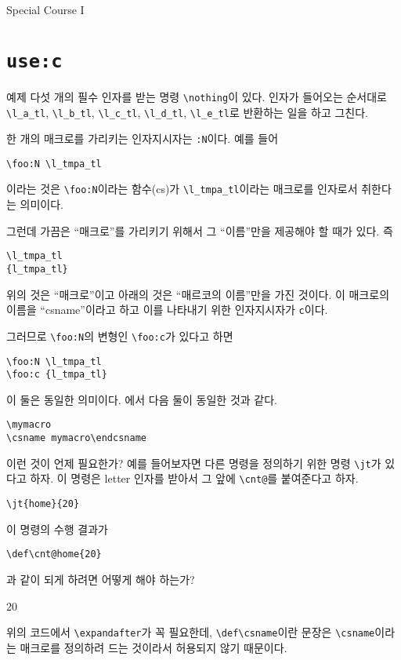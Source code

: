 \documentclass[a4paper,amsmath]{oblivoir}
\begin{document}
\begin{intro}[100]
Special Course I
\end{intro}

\section{\texttt{\bs use:c}}

\begin{questiona}{예제}
다섯 개의 필수 인자를 받는 명령 \verb|\nothing|이 있다. 인자가 들어오는 순서대로
\verb|\l_a_tl|, \verb|\l_b_tl|, \verb|\l_c_tl|, \verb|\l_d_tl|, \verb|\l_e_tl|로
반환하는 일을 하고 그친다.
\end{questiona}

한 개의 매크로를 가리키는 인자지시자는 \verb|:N|이다. 예를 들어
\begin{verbatim}
\foo:N \l_tmpa_tl
\end{verbatim}
이라는 것은 \verb|\foo:N|이라는 함수(cs)가 \verb|\l_tmpa_tl|이라는 매크로를 인자로서
취한다는 의미이다.

그런데 가끔은 “매크로”를 가리키기 위해서 그 “이름”만을 제공해야 할 때가 있다. 즉 
\begin{verbatim}
\l_tmpa_tl
{l_tmpa_tl}
\end{verbatim}
위의 것은 “매크로”이고 아래의 것은 “매르코의 이름”만을 가진 것이다. 이 매크로의 이름을 “csname”이라고 하고 이를 나타내기 위한 인자지시자가 \verb|c|이다.

그러므로 \verb|\foo:N|의 변형인 \verb|\foo:c|가 있다고 하면
\begin{verbatim}
\foo:N \l_tmpa_tl
\foo:c {l_tmpa_tl}
\end{verbatim}
이 둘은 동일한 의미이다.
에서 다음 둘이 동일한 것과 같다.
\begin{verbatim}
\mymacro
\csname mymacro\endcsname
\end{verbatim}

이런 것이 언제 필요한가? 예를 들어보자면 다른 명령을 정의하기 위한 명령 \verb|\jt|가 있다고 하자.
이 명령은 letter 인자를 받아서 그 앞에 \verb|\cnt@|를 붙여준다고 하자.
\begin{verbatim}
\jt{home}{20}
\end{verbatim}
이 명령의 수행 결과가
\begin{verbatim}
\def\cnt@home{20}
\end{verbatim}
과 같이 되게 하려면 어떻게 해야 하는가?
\begin{exampleside}
\makeatletter
\def\jt#1#2{\expandafter\def\csname cnt@#1\endcsname{#2}}
\jt{home}{20}
\cnt@home
\makeatother
\end{exampleside}
위의 코드에서 \verb|\expandafter|가 꼭 필요한데, \verb|\def\csname|이란 문장은 \verb|\csname|이라는 매크로를 정의하려 드는 것이라서 허용되지 않기 때문이다.
\end{document}
